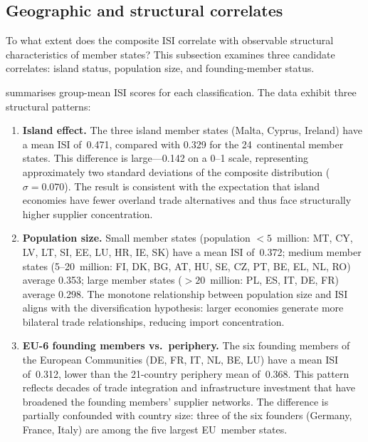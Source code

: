 \subsection{Geographic and structural correlates}\label{sec:geo-correlates}

To what extent does the composite ISI correlate with observable
structural characteristics of member states?  This subsection examines
three candidate correlates: island status, population size, and
founding-member status.



 summarises group-mean ISI scores for each
classification.  The data exhibit three structural patterns:

\begin{enumerate}[leftmargin=2em]
  \item \textbf{Island effect.}
    The three island member states (Malta, Cyprus, Ireland) have
    a mean ISI of~0.471, compared with 0.329 for the 24~continental
    member states.  This difference is large---0.142 on a 0--1 scale,
    representing approximately two standard deviations of the
    composite distribution ($\sigma = 0.070$).  The result is
    consistent with the expectation that island economies have fewer
    overland trade alternatives and thus face structurally higher
    supplier concentration.

  \item \textbf{Population size.}
    Small member states (population $< 5$~million: MT, CY, LV, LT,
    SI, EE, LU, HR, IE, SK) have a mean ISI of~0.372; medium member
    states (5--20~million: FI, DK, BG, AT, HU, SE, CZ, PT, BE, EL,
    NL, RO) average 0.353; large member states ($> 20$~million: PL,
    ES, IT, DE, FR) average 0.298.  The monotone relationship between
    population size and ISI aligns with the diversification
    hypothesis: larger economies generate more bilateral trade
    relationships, reducing import concentration.

  \item \textbf{EU-6 founding members vs.\ periphery.}
    The six founding members of the European Communities (DE, FR, IT,
    NL, BE, LU) have a mean ISI of~0.312, lower than the 21-country
    periphery mean of~0.368.  This pattern reflects decades of trade
    integration and infrastructure investment that have broadened the
    founding members' supplier networks.  The difference
    is partially confounded with country size: three of the six
    founders (Germany, France, Italy) are among the five largest
    EU~member states.
\end{enumerate}

